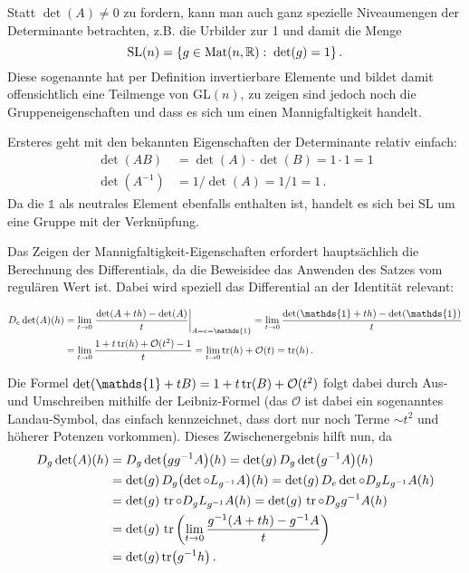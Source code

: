 \documentclass[../H_Analysis_main.tex]{subfiles}
\begin{document}
\begin{bsp}
Statt $\det(A) \neq 0$ zu fordern, kann man auch ganz spezielle Niveaumengen der Determinante betrachten, z.B. die Urbilder zur 1 und damit die Menge
\begin{equation}
\text{SL}(n) = \qty{g \in \text{Mat}(n, \mathbb{R}): \; \det(g) = 1} \, .
\end{equation}
Diese sogenannte  hat per Definition invertierbare Elemente und bildet damit offensichtlich eine Teilmenge von GL$(n)$, zu zeigen sind jedoch noch die Gruppeneigenschaften und dass es sich um einen Mannigfaltigkeit handelt.

Ersteres geht mit den bekannten Eigenschaften der Determinante relativ einfach:
\begin{align*}
\det(AB) &= \det(A) \cdot \det(B) = 1 \cdot 1 = 1
\\
\det(A^{-1}) &= 1/ \det(A) = 1/ 1 = 1 \, .
\end{align*}
Da die $\mathds{1}$ als neutrales Element ebenfalls enthalten ist, handelt es sich bei SL um eine Gruppe mit der Verknüpfung.


Das Zeigen der Mannigfaltigkeit-Eigenschaften erfordert hauptsächlich die Berechnung des Differentials, da die Beweisidee das Anwenden des Satzes vom regulären Wert ist. Dabei wird speziell das Differential an der Identität relevant: 

\begin{align}
D_e \det(A) (h) &= \lim_{t \rightarrow 0} \eval{\frac{\det(A + t h) - \det(A)}{t}}_{A = e = \mathds{1}} = \lim_{t \rightarrow 0} \frac{\det(\mathds{1} + t h) - \det(\mathds{1})}{t}
\notag\\
&= \lim_{t \rightarrow 0} \frac{1 + t \tr(h) + \mathcal{O}(t^2) - 1}{t} = \lim_{t \rightarrow 0} \tr(h) + \mathcal{O}(t) = \tr(h) \, .
\end{align}

Die Formel $\det(\mathds{1} + t B) = 1 + t \tr(B) + \mathcal{O}(t^2)$ folgt dabei durch Aus- und Umschreiben mithilfe der Leibniz-Formel (das $\mathcal{O}$ ist dabei ein sogenanntes Landau-Symbol, das einfach kennzeichnet, dass dort nur noch Terme $\sim t^2$ und höherer Potenzen vorkommen). Dieses Zwischenergebnis hilft nun, da
\begin{align}
D_g \det(A) (h) &= D_g \det(g g^{-1} A) (h) = \det(g) \, D_g \det(g^{-1} A) (h)
\notag\\
&= \det(g) \, D_g \qty(\det \circ L_{g^{-1}} A) (h) = \det(g) \, D_e \det \circ D_g L_{g^{-1}} A (h)
\notag\\
&= \det(g) \, \tr \circ D_g L_{g^{-1}} A (h) = \det(g) \, \tr \circ D_g g^{-1} A (h)
\notag\\
&= \det(g) \, \tr \qty(\lim_{t \rightarrow 0} \frac{g^{-1} (A + th) - g^{-1} A}{t})
\notag\\
&= \det(g) \tr(g^{-1} h) \, .
\end{align}


\end{bsp}
\end{document}
